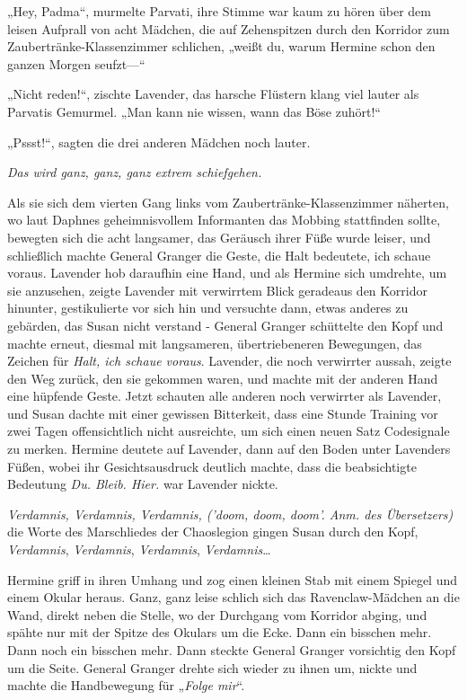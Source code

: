 {„Hey, Padma“, murmelte Parvati, ihre Stimme war kaum zu hören über dem leisen Aufprall von acht Mädchen, die auf Zehenspitzen durch den Korridor zum Zaubertränke-Klassenzimmer schlichen, „weißt du, warum Hermine schon den ganzen Morgen seufzt—“

„Nicht reden!“, zischte Lavender, das harsche Flüstern klang viel lauter als Parvatis Gemurmel. „Man kann nie wissen, wann das Böse zuhört!“

„Pssst!“, sagten die drei anderen Mädchen noch lauter.

\emph{Das wird ganz, ganz, ganz extrem schiefgehen.}

Als sie sich dem vierten Gang links vom Zaubertränke-Klassenzimmer näherten, wo laut Daphnes geheimnisvollem Informanten das Mobbing stattfinden sollte, bewegten sich die acht langsamer, das Geräusch ihrer Füße wurde leiser, und schließlich machte General Granger die Geste, die Halt bedeutete, ich schaue voraus. Lavender hob daraufhin eine Hand, und als Hermine sich umdrehte, um sie anzusehen, zeigte Lavender mit verwirrtem Blick geradeaus den Korridor hinunter, gestikulierte vor sich hin und versuchte dann, etwas anderes zu gebärden, das Susan nicht verstand - General Granger schüttelte den Kopf und machte erneut, diesmal mit langsameren, übertriebeneren Bewegungen, das Zeichen für \emph{Halt, ich schaue voraus}. Lavender, die noch verwirrter aussah, zeigte den Weg zurück, den sie gekommen waren, und machte mit der anderen Hand eine hüpfende Geste. Jetzt schauten alle anderen noch verwirrter als Lavender, und Susan dachte mit einer gewissen Bitterkeit, dass eine Stunde Training vor zwei Tagen offensichtlich nicht ausreichte, um sich einen neuen Satz Codesignale zu merken. Hermine deutete auf Lavender, dann auf den Boden unter Lavenders Füßen, wobei ihr Gesichtsausdruck deutlich machte, dass die beabsichtigte Bedeutung \emph{Du. Bleib. Hier.} war Lavender nickte.

\emph{Verdamnis, Verdamnis, Verdamnis, ('doom, doom, doom'. Anm. des Übersetzers)} die Worte des Marschliedes der Chaoslegion gingen Susan durch den Kopf, \emph{Verdamnis}, \emph{Verdamnis}, \emph{Verdamnis}, \emph{Verdamnis}…

Hermine griff in ihren Umhang und zog einen kleinen Stab mit einem Spiegel und einem Okular heraus. Ganz, ganz leise schlich sich das Ravenclaw-Mädchen an die Wand, direkt neben die Stelle, wo der Durchgang vom Korridor abging, und spähte nur mit der Spitze des Okulars um die Ecke. Dann ein bisschen mehr. Dann noch ein bisschen mehr. Dann steckte General Granger vorsichtig den Kopf um die Seite. General Granger drehte sich wieder zu ihnen um, nickte und machte die Handbewegung für „\emph{Folge mir}“.

}

